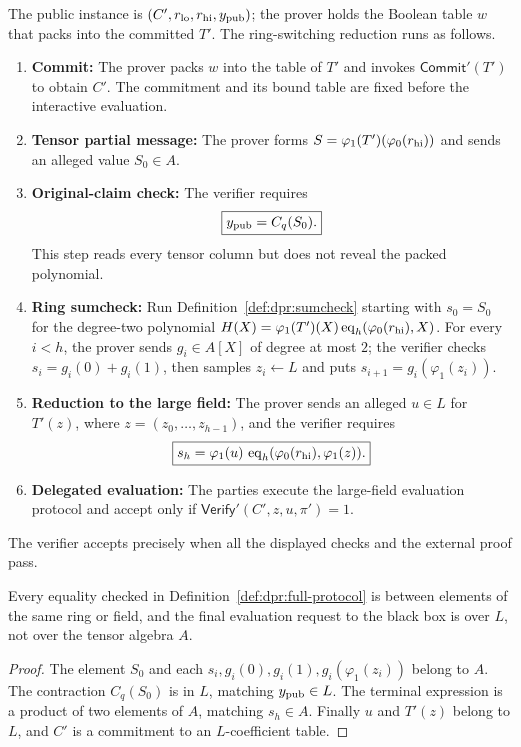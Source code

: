 \begin{definition}\label{def:dpr:full-protocol}
The public instance is
$(C',r_{\rm lo},r_{\rm hi},y_{\rm pub})$;
the prover holds the Boolean table $w$
that packs into the committed $T'$.
The ring-switching reduction runs as follows.
\begin{enumerate}[label=\textup{(\roman*)}]
 \item \textbf{Commit:} The prover packs
 $w$ into the table of $T'$ and
 invokes $\mathsf{Commit}'(T')$ to obtain $C'$.
 The commitment and its bound table are fixed
 before the interactive evaluation.
 \item \textbf{Tensor partial message:}
 The prover forms
 $S=\varphi_1(T')(\varphi_0(r_{\rm hi}))$
 and sends an alleged value $S_0\in A$.
 \item \textbf{Original-claim check:}
 The verifier requires
 \[
 \boxed{y_{\rm pub}=C_q(S_0).}
 \]
 This step reads every tensor column
 but does not reveal the packed polynomial.
 \item \textbf{Ring sumcheck:}
 Run Definition~\ref{def:dpr:sumcheck}
 starting with $s_0=S_0$
 for the degree-two polynomial
 $H(X)=\varphi_1(T')(X)
       \operatorname{eq}_h(\varphi_0(r_{\rm hi}),X)$.
 For every $i<h$, the prover sends $g_i\in A[X]$
 of degree at most $2$; the verifier
 checks $s_i=g_i(0)+g_i(1)$, then samples
 $z_i\leftarrow L$ and puts
 $s_{i+1}=g_i(\varphi_1(z_i))$.
 \item \textbf{Reduction to the large field:}
 The prover sends an alleged
 $u\in L$ for $T'(z)$, where
 $z=(z_0,\ldots,z_{h-1})$,
 and the verifier requires
 \[
 \boxed{s_h=\varphi_1(u)\,
 \operatorname{eq}_h(\varphi_0(r_{\rm hi}),\varphi_1(z)).}
 \]
 \item \textbf{Delegated evaluation:}
 The parties execute the large-field
 evaluation protocol and accept only if
 $\mathsf{Verify}'(C',z,u,\pi')=1$.
\end{enumerate}
The verifier accepts precisely when
all the displayed checks and the
external proof pass.
\end{definition}

\begin{lemma}\label{lem:dpr:welltyped}
Every equality checked in
Definition~\ref{def:dpr:full-protocol}
is between elements of the same
ring or field, and the final
evaluation request to the black box
is over $L$, not over the tensor
algebra $A$.
\end{lemma}
\begin{proof}
The element $S_0$ and each
$s_i,g_i(0),g_i(1),
g_i(\varphi_1(z_i))$ belong to $A$.
The contraction $C_q(S_0)$ is in $L$,
matching $y_{\rm pub}\in L$.
The terminal expression is a
product of two elements of $A$,
matching $s_h\in A$.
Finally $u$ and $T'(z)$ belong to
$L$, and $C'$ is a commitment
to an $L$-coefficient table.
\end{proof}

